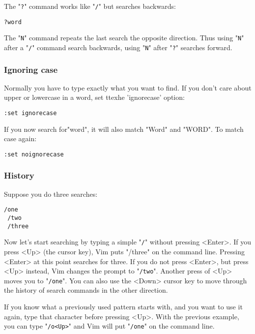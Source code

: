 The "\verb!?!" command works like "\verb!/!" but searches backwards:

 \begin{Verbatim}[samepage=true]
 ?word
 \end{Verbatim}

The "\verb!N!" command repeats the last search the opposite direction.
Thus using "\verb!N!" after a "\verb!/!" command search backwards, using "\verb!N!" after "\verb!?!" searches forward.

\subsubsection{Ignoring case}

Normally you have to type exactly what you want to find.
If you don't care about upper or lowercase in a word, set ttexhe 'ignorecase' option:

 \begin{Verbatim}[samepage=true]
 :set ignorecase
 \end{Verbatim}

If you now search for"word", it will also match "Word" and "WORD".
To match case again:

 \begin{Verbatim}[samepage=true]
 :set noignorecase
 \end{Verbatim}

\subsubsection{History}

Suppose you do three searches:

 \begin{Verbatim}[samepage=true]
 /one
 /two
 /three
 \end{Verbatim}

Now let's start searching by typing a simple "\verb!/!" without pressing <Enter>.
If you press <Up> (the cursor key), Vim puts "/three" on the command line.
Pressing <Enter> at this point searches for three.
If you do not press <Enter>, but press <Up> instead, Vim changes the prompt to "\verb!/two!".
Another press of <Up> moves you to "\verb!/one!".
You can also use the <Down> cursor key to move through the history of search commands in the other direction.

If you know what a previously used pattern starts with, and you want to use it again, type that character before pressing <Up>.
With the previous example, you can type "\verb!/o<Up>!" and Vim will put "\verb!/one!" on the command line.

